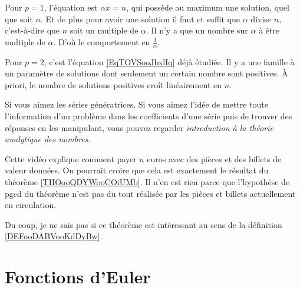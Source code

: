 \begin{example}
	Pour \( p=1\), l'équation est \( \alpha x=n\), qui possède au maximum une solution, quel que soit \( n\). Et de plus pour avoir une solution il faut et suffit que \( \alpha\) divise \( n\), c'est-à-dire que \( n\) soit un multiple de \( \alpha\). Il n'y a que un nombre sur \( \alpha\) à être multiple de \( \alpha\). D'où le comportement en \( \frac{1}{ \alpha }\).

	Pour \( p=2\), c'est l'équation \eqref{EqTOVSooJbxlIq} déjà étudiée. Il y a une famille à un paramètre de solutions dont seulement un certain nombre sont positives. À priori, le nombre de solutions positives croît linéairement en \( n\).
\end{example}


\begin{normaltext}
	Si vous aimez les séries génératrices. Si vous aimez l'idée de mettre toute l'information d'un problème dans les coefficients d'une série puis de trouver des réponses en les manipulant, vous pouvez regarder \emph{introduction à la théorie analytique des nombres}\cite{BIBooOSKTooBuVtBB}.

	Cette vidéo explique comment payer \( n\) euros avec des pièces et des billets de valeur données. On pourrait croire que cela est exactement le résultat du théorème \ref{THOooQDYWooCOiUMb}. Il n'en est rien parce que l'hypothèse de pgcd du théorème n'est pas du tout réalisée par les pièces et billets actuellement en circulation.

	Du coup, je ne sais pas si ce théorème est intéressant au sens de la définition \ref{DEFooDABVooKdDyBw}.
\end{normaltext}

\section{Fonctions d'Euler}

